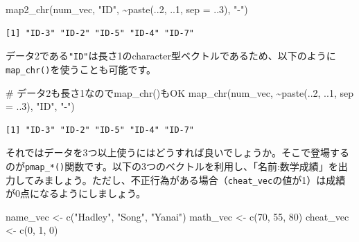 \documentclass[
  a4paper,
  pandoc,
  ja=standard,
  jafont=haranoaji]{bxjsbook}
\newenvironment{Shaded}{\begin{snugshade}}{\end{snugshade}}
\newcommand{\AttributeTok}[1]{\textcolor[rgb]{0.00,0.48,0.65}{#1}}
\newcommand{\CommentTok}[1]{\textcolor[rgb]{0.37,0.37,0.37}{#1}}
\newcommand{\DecValTok}[1]{\textcolor[rgb]{0.68,0.00,0.00}{#1}}
\newcommand{\FunctionTok}[1]{\textcolor[rgb]{0.28,0.35,0.67}{#1}}
\newcommand{\NormalTok}[1]{\textcolor[rgb]{0.00,0.48,0.65}{#1}}
\newcommand{\OtherTok}[1]{\textcolor[rgb]{0.00,0.48,0.65}{#1}}
\newcommand{\SpecialCharTok}[1]{\textcolor[rgb]{0.37,0.37,0.37}{#1}}
\newcommand{\StringTok}[1]{\textcolor[rgb]{0.13,0.47,0.30}{#1}}
\begin{document}
\begin{Shaded}
\begin{Highlighting}[numbers=left,,]
\FunctionTok{map2\_chr}\NormalTok{(num\_vec, }\StringTok{"ID"}\NormalTok{, }\SpecialCharTok{\textasciitilde{}}\FunctionTok{paste}\NormalTok{(..}\DecValTok{2}\NormalTok{, ..}\DecValTok{1}\NormalTok{, }\AttributeTok{sep =}\NormalTok{ ..}\DecValTok{3}\NormalTok{), }\StringTok{"{-}"}\NormalTok{)}
\end{Highlighting}
\end{Shaded}

\begin{verbatim}
[1] "ID-3" "ID-2" "ID-5" "ID-4" "ID-7"
\end{verbatim}

データ2である\texttt{"ID"}は長さ1のcharacter型ベクトルであるため、以下のように\texttt{map\_chr()}を使うことも可能です。

\begin{Shaded}
\begin{Highlighting}[numbers=left,,]
\CommentTok{\# データ2も長さ1なのでmap\_chr()もOK}
\FunctionTok{map\_chr}\NormalTok{(num\_vec, }\SpecialCharTok{\textasciitilde{}}\FunctionTok{paste}\NormalTok{(..}\DecValTok{2}\NormalTok{, ..}\DecValTok{1}\NormalTok{, }\AttributeTok{sep =}\NormalTok{ ..}\DecValTok{3}\NormalTok{), }\StringTok{"ID"}\NormalTok{, }\StringTok{"{-}"}\NormalTok{)}
\end{Highlighting}
\end{Shaded}

\begin{verbatim}
[1] "ID-3" "ID-2" "ID-5" "ID-4" "ID-7"
\end{verbatim}

それではデータを3つ以上使うにはどうすれば良いでしょうか。そこで登場するのが\texttt{pmap\_*()}関数です。以下の3つのベクトルを利用し、「名前:数学成績」を出力してみましょう。ただし、不正行為がある場合（\texttt{cheat\_vec}の値が1）は成績が0点になるようにしましょう。

\begin{Shaded}
\begin{Highlighting}[numbers=left,,]
\NormalTok{name\_vec  }\OtherTok{\textless{}{-}} \FunctionTok{c}\NormalTok{(}\StringTok{"Hadley"}\NormalTok{, }\StringTok{"Song"}\NormalTok{, }\StringTok{"Yanai"}\NormalTok{)}
\NormalTok{math\_vec  }\OtherTok{\textless{}{-}} \FunctionTok{c}\NormalTok{(}\DecValTok{70}\NormalTok{, }\DecValTok{55}\NormalTok{, }\DecValTok{80}\NormalTok{)}
\NormalTok{cheat\_vec }\OtherTok{\textless{}{-}} \FunctionTok{c}\NormalTok{(}\DecValTok{0}\NormalTok{, }\DecValTok{1}\NormalTok{, }\DecValTok{0}\NormalTok{)}
\end{Highlighting}
\end{Shaded}
\end{document}
